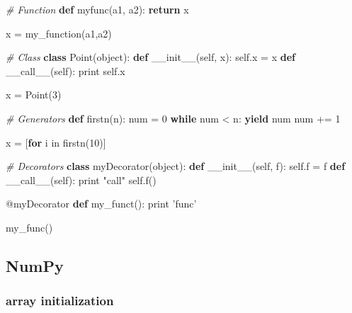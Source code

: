 \documentclass[10pt,a4paperpaper,twocolumn]{article}
\newenvironment{Shaded}{}{}
\newcommand{\KeywordTok}[1]{\textcolor[rgb]{0.00,0.44,0.13}{\textbf{{#1}}}}
\newcommand{\DecValTok}[1]{\textcolor[rgb]{0.25,0.63,0.44}{{#1}}}
\newcommand{\StringTok}[1]{\textcolor[rgb]{0.25,0.44,0.63}{{#1}}}
\newcommand{\CommentTok}[1]{\textcolor[rgb]{0.38,0.63,0.69}{\textit{{#1}}}}
\newcommand{\FunctionTok}[1]{\textcolor[rgb]{0.02,0.16,0.49}{{#1}}}
\newcommand{\VariableTok}[1]{\textcolor[rgb]{0.10,0.09,0.49}{{#1}}}
\newcommand{\ControlFlowTok}[1]{\textcolor[rgb]{0.00,0.44,0.13}{\textbf{{#1}}}}
\newcommand{\OperatorTok}[1]{\textcolor[rgb]{0.40,0.40,0.40}{{#1}}}
\newcommand{\BuiltInTok}[1]{{#1}}
\newcommand{\AttributeTok}[1]{\textcolor[rgb]{0.49,0.56,0.16}{{#1}}}
\newcommand{\NormalTok}[1]{{#1}}
\begin{document}
\begin{Shaded}
\begin{Highlighting}[]
\CommentTok{# Function}
\KeywordTok{def} \NormalTok{myfunc(a1, a2):}
    \ControlFlowTok{return} \NormalTok{x}

\NormalTok{x }\OperatorTok{=} \NormalTok{my_function(a1,a2)}

\CommentTok{# Class}
\KeywordTok{class} \NormalTok{Point(}\BuiltInTok{object}\NormalTok{):}
    \KeywordTok{def} \FunctionTok{__init__}\NormalTok{(}\VariableTok{self}\NormalTok{, x):}
        \VariableTok{self}\NormalTok{.x }\OperatorTok{=} \NormalTok{x}
    \KeywordTok{def} \FunctionTok{__call__}\NormalTok{(}\VariableTok{self}\NormalTok{):}
        \BuiltInTok{print} \VariableTok{self}\NormalTok{.x}

\NormalTok{x }\OperatorTok{=} \NormalTok{Point(}\DecValTok{3}\NormalTok{)}

\CommentTok{# Generators}
\KeywordTok{def} \NormalTok{firstn(n):}
    \NormalTok{num }\OperatorTok{=} \DecValTok{0}
    \ControlFlowTok{while} \NormalTok{num }\OperatorTok{<} \NormalTok{n:}
        \ControlFlowTok{yield} \NormalTok{num}
        \NormalTok{num }\OperatorTok{+=} \DecValTok{1}

\NormalTok{x }\OperatorTok{=} \NormalTok{[}\ControlFlowTok{for} \NormalTok{i }\OperatorTok{in} \NormalTok{firstn(}\DecValTok{10}\NormalTok{)]}

\CommentTok{# Decorators}
\KeywordTok{class} \NormalTok{myDecorator(}\BuiltInTok{object}\NormalTok{):}
    \KeywordTok{def} \FunctionTok{__init__}\NormalTok{(}\VariableTok{self}\NormalTok{, f):}
        \VariableTok{self}\NormalTok{.f }\OperatorTok{=} \NormalTok{f}
    \KeywordTok{def} \FunctionTok{__call__}\NormalTok{(}\VariableTok{self}\NormalTok{):}
        \BuiltInTok{print} \StringTok{"call"}
        \VariableTok{self}\NormalTok{.f()}

\AttributeTok{@myDecorator}
\KeywordTok{def} \NormalTok{my_funct():}
    \BuiltInTok{print} \StringTok{'func'}

\NormalTok{my_func()}
\end{Highlighting}
\end{Shaded}

\hypertarget{numpy}{\subsection{NumPy}\label{numpy}}

\hypertarget{array-initialization}{\subsubsection{array
initialization}\label{array-initialization}}
\end{document}
